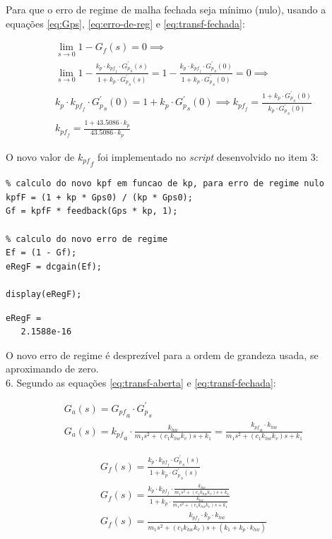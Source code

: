 \documentclass[a4paper,11pt]{article}
\begin{document}
Para que o erro de regime de malha fechada seja mínimo (nulo), usando a
equações \ref{eq:Gps}, \ref{eq:erro-de-reg} e \ref{eq:transf-fechada}:

\begin{gather*}
    \lim_{s\to0} 1 - G_f\left(s\right) = 0 \implies \\
    \lim_{s\to0} 1 - \frac{k_p \cdot k_{{pf}_f} \cdot
        {G^\prime_p}_s\left(s\right)}{1 + k_p \cdot
        {G^\prime_p}_s\left(s\right)} = 1 - \frac{k_p \cdot k_{{pf}_f} \cdot
        {G^\prime_p}_s\left(0\right)}{1 + k_p \cdot
        {G^\prime_p}_s\left(0\right)} = 0 \implies \\
    k_p \cdot k_{{pf}_f} \cdot {G^\prime_p}_s\left(0\right) =
        1 + k_p \cdot {G^\prime_p}_s\left(0\right) \implies
        k_{{pf}_f} = \frac{1 + k_p \cdot {G^\prime_p}_s\left(0\right)}
        {k_p \cdot {G^\prime_p}_s\left(0\right)} \\
    k_{{pf}_f} = \frac{1 + 43.5086 \cdot k_p}
        {43.5086 \cdot k_p}
\end{gather*}

O novo valor de ${k_{pf}}_f$ foi implementado no \textit{script} desenvolvido no
item 3:

\begin{lstlisting}
% calculo do novo kpf em funcao de kp, para erro de regime nulo
kpfF = (1 + kp * Gps0) / (kp * Gps0);
Gf = kpfF * feedback(Gps * kp, 1);

% calculo do novo erro de regime
Ef = (1 - Gf);
eRegF = dcgain(Ef);

display(eRegF);
\end{lstlisting}
\begin{lstlisting}
eRegF =
   2.1588e-16
\end{lstlisting}

O novo erro de regime é desprezível para a ordem de grandeza usada, se
aproximando de zero. \\

6. Segundo as equações \ref{eq:transf-aberta} e \ref{eq:transf-fechada}:

\begin{gather*}
    G_a\left(s\right) = {G_{pf}}_a \cdot {G^\prime_p}_s \\
    G_a\left(s\right) = {k_{pf}}_a \cdot \frac{k_{hw}}
        {m_1s^2 + \left(c_1 k_{hw} k_v\right) s + k_1} =
        \frac{{k_{pf}}_a \cdot k_{hw}}
        {m_1s^2 + \left(c_1 k_{hw} k_v\right) s + k_1}
\end{gather*}

\begin{gather*}
    G_f\left(s\right) =
        \frac{k_p \cdot k_{{pf}_f} \cdot {G^\prime_p}_s\left(s\right)}
        {1 + k_p \cdot {G^\prime_p}_s\left(s\right)} \\
    G_f\left(s\right) =
        \frac{k_p \cdot k_{{pf}_f} \cdot \frac{k_{hw}}
        {m_1s^2 + \left(c_1 k_{hw} k_v\right) s + k_1}}
        {1 + k_p \cdot \frac{k_{hw}}
        {m_1s^2 + \left(c_1 k_{hw} k_v\right) s + k_1}} \\
    G_f\left(s\right) =
        \frac{k_{{pf}_f} \cdot k_p \cdot k_{hw}}
        {m_1s^2 + \left(c_1 k_{hw} k_v\right) s +
        \left(k_1 + k_p \cdot k_{hw}\right)}
\end{gather*}
\end{document}
